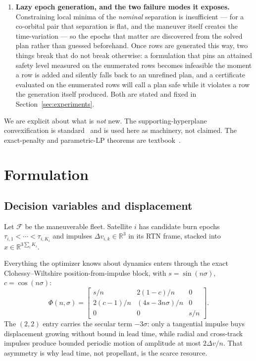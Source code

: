 \documentclass[11pt]{article}
\theoremstyle{definition}
\theoremstyle{remark}
\newcommand{\dv}{\Delta v}
\newcommand{\R}{\mathbb{R}}
\begin{document}
\begin{enumerate}
\item \textbf{Lazy epoch generation, and the two failure modes it exposes.}
Constraining local minima of the \emph{nominal} separation is insufficient ---
for a co-orbital pair that separation is flat, and the maneuver itself creates
the time-variation --- so the epochs that matter are discovered from the solved
plan rather than guessed beforehand. Once rows are generated this way, two
things break that do not break otherwise: a formulation that pins an attained
safety level measured on the enumerated rows becomes infeasible the moment a
row is added and silently falls back to an unrefined plan, and a certificate
evaluated on the enumerated rows will call a plan safe while it violates a row
the generation itself produced. Both are stated and fixed in
Section~\ref{sec:experiments}.
\end{enumerate}

We are explicit about what is \emph{not} new. The supporting-hyperplane
convexification is standard~\cite{mueller2009,mao2017,armellin2021} and is used
here as machinery, not claimed. The exact-penalty and parametric-LP theorems
are textbook~\cite{bertsekas1999,schrijver1986}.

\section{Formulation}

\subsection{Decision variables and displacement}

Let $\mathcal{F}$ be the maneuverable fleet. Satellite $i$ has candidate burn
epochs $\tau_{i,1} < \cdots < \tau_{i,K_i}$ and impulses
$\dv_{i,k} \in \R^3$ in its RTN frame, stacked into
$x \in \R^{3\sum_i K_i}$.

Everything the optimizer knows about dynamics enters through the exact
Clohessy--Wiltshire position-from-impulse block, with $s=\sin(n\sigma)$,
$c=\cos(n\sigma)$:
\begin{equation}
\Phi(n,\sigma) =
\begin{bmatrix}
s/n & 2(1-c)/n & 0\\
2(c-1)/n & (4s-3n\sigma)/n & 0\\
0 & 0 & s/n
\end{bmatrix}.
\label{eq:phi}
\end{equation}
The $(2,2)$ entry carries the secular term $-3\sigma$: only a tangential
impulse buys displacement growing without bound in lead time, while radial and
cross-track impulses produce bounded periodic motion of amplitude at most
$2\dv/n$. That asymmetry is why lead time, not propellant, is the scarce
resource.
\end{document}
